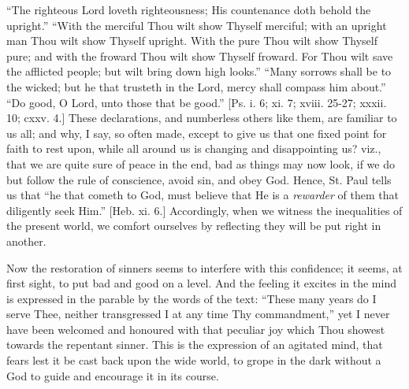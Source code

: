 ``The righteous Lord loveth righteousness; His countenance doth
behold the upright.'' ``With the merciful Thou wilt show
Thyself merciful; with an upright man Thou wilt show Thyself upright.
With the pure Thou wilt show Thyself pure; and with the froward Thou
wilt show Thyself froward. For Thou wilt save the afflicted people;
but wilt bring down high looks.'' ``Many sorrows shall be to
the wicked; but he that trusteth in the Lord, mercy shall compass him
about.'' ``Do good, O Lord, unto those that be good.''
[Ps. i. 6; xi. 7; xviii. 25-27; xxxii. 10; cxxv. 4.] These
declarations, and numberless others like them, are familiar to us all;
and why, I say, so often made, except to give us that one fixed point
for faith to rest upon, while all around us is changing and
disappointing us? viz., that we are quite sure of peace in the end,
bad as things may now look, if we do but follow the rule of
conscience, avoid sin, and obey God. Hence, St. Paul tells us that
``he that cometh to God, must believe that He is a \emph{rewarder}
of them that diligently seek Him.'' [Heb. xi. 6.] Accordingly,
when we witness the inequalities of the present world, we comfort
ourselves by reflecting they will be put right in another.

Now the restoration of sinners seems to interfere with this
confidence; it seems, at first sight, to put bad and good on a level.
And the feeling it excites in the mind is expressed in the parable by
the words of the text: ``These many years do I serve Thee, neither
transgressed I at any time Thy commandment,'' yet I never have
been welcomed and honoured with that peculiar joy which Thou showest
towards the repentant sinner. This is the expression of an agitated
mind, that fears lest it be cast back upon the wide world, to grope in
the dark without a God to guide and encourage it in its course.

